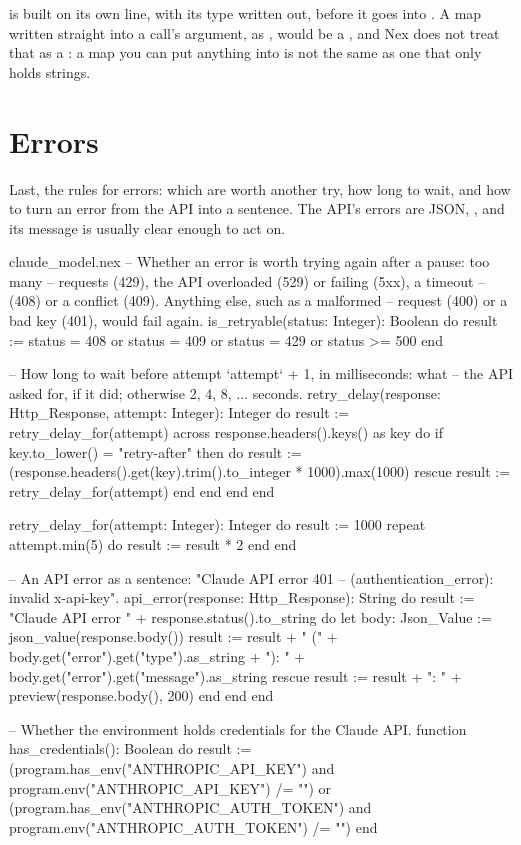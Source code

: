  is built on its own line, with its type written out,
before it goes into . A map written straight into a call's
argument, as , would
be a , and Nex does not treat that as a
: a map you can put anything into is not the same as
one that only holds strings.

\section{Errors}

Last, the rules for errors: which are worth another try, how long to wait,
and how to turn an error from the API into a sentence. The API's errors
are JSON, , and its message is usually clear enough to act on.

\begin{continued}{claude_model.nex}
  -- Whether an error is worth trying again after a pause: too many
  -- requests (429), the API overloaded (529) or failing (5xx), a timeout
  -- (408) or a conflict (409). Anything else, such as a malformed
  -- request (400) or a bad key (401), would fail again.
  is_retryable(status: Integer): Boolean do
    result := status = 408 or status = 409 or status = 429 or status >= 500
  end

  -- How long to wait before attempt `attempt` + 1, in milliseconds: what
  -- the API asked for, if it did; otherwise 2, 4, 8, ... seconds.
  retry_delay(response: Http_Response, attempt: Integer): Integer do
    result := retry_delay_for(attempt)
    across response.headers().keys() as key do
      if key.to_lower() = "retry-after" then
        do
          result := (response.headers().get(key).trim().to_integer * 1000).max(1000)
        rescue
          result := retry_delay_for(attempt)
        end
      end
    end
  end

  retry_delay_for(attempt: Integer): Integer do
    result := 1000
    repeat attempt.min(5) do
      result := result * 2
    end
  end

  -- An API error as a sentence: "Claude API error 401
  -- (authentication_error): invalid x-api-key".
  api_error(response: Http_Response): String do
    result := "Claude API error " + response.status().to_string
    do
      let body: Json_Value := json_value(response.body())
      result := result + " (" + body.get("error").get("type").as_string + "): "
        + body.get("error").get("message").as_string
    rescue
      result := result + ": " + preview(response.body(), 200)
    end
  end
end

-- Whether the environment holds credentials for the Claude API.
function has_credentials(): Boolean do
  result := (program.has_env("ANTHROPIC_API_KEY") and program.env("ANTHROPIC_API_KEY") /= "")
    or (program.has_env("ANTHROPIC_AUTH_TOKEN") and program.env("ANTHROPIC_AUTH_TOKEN") /= "")
end
\end{continued}

